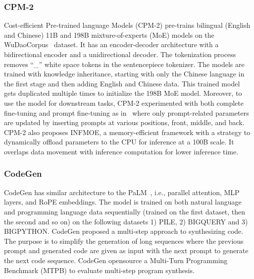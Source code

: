 \subsubsection{CPM-2~\cite{CPM-2}}
Cost-efficient Pre-trained language Models (CPM-2) pre-trains bilingual (English and Chinese) 11B and 198B mixture-of-experts (MoE) models on the WuDaoCorpus~\cite{WuDaoCorpus} dataset. It has an encoder-decoder architecture with a bidirectional encoder and a unidirectional decoder. The tokenization process removes \enquote{\_} white space tokens in the sentencepiece tokenizer. The models are trained with knowledge inheritance, starting with only the Chinese language in the first stage and then adding English and Chinese data. This trained model gets duplicated multiple times to initialize the 198B MoE model. Moreover, to use the model for downstream tasks, CPM-2 experimented with both complete fine-tuning and prompt fine-tuning as in~\cite{LMAdapted} where only prompt-related parameters are updated by inserting prompts at various positions, front, middle, and back. CPM-2 also proposes INFMOE, a memory-efficient framework with a strategy to dynamically offload parameters to the CPU for inference at a 100B scale. It overlaps data movement with inference computation for lower inference time.   

\subsubsection{CodeGen~\cite{CodeGen}}
CodeGen has similar architecture to the PaLM~\cite{PaLM}, i.e., parallel attention, MLP layers, and RoPE embeddings. The model is trained on both natural language and programming language data sequentially (trained on the first dataset, then the second and so on) on the following datasets 1) PILE, 2) BIGQUERY and 3) BIGPYTHON. CodeGen proposed a multi-step approach to synthesizing code. The purpose is to simplify the generation of long sequences where the previous prompt and generated code are given as input with the next prompt to generate the next code sequence. CodeGen opensource a Multi-Turn Programming Benchmark (MTPB) to evaluate multi-step program synthesis.   

